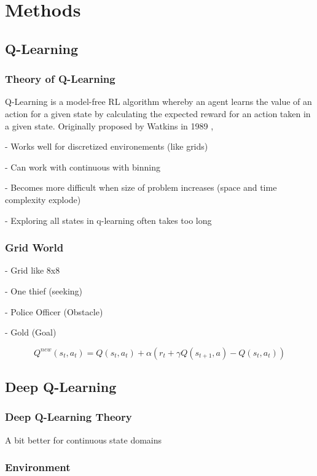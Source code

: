 \documentclass{jfm}
\begin{document}
\section{Methods}
\subsection{Q-Learning}
\subsubsection{Theory of Q-Learning}
Q-Learning is a model-free RL algorithm whereby an agent learns the value of an action for a given state  by calculating the expected reward for an action taken in a given state. Originally proposed by Watkins in 1989 \cite{Watkins1989},

- Works well for discretized environements (like grids)

- Can work with continuous with binning

- Becomes more difficult when size of problem increases (space and time complexity explode)

- Exploring all states in q-learning often takes too long

\subsubsection{Grid World}
- Grid like 8x8

- One thief (seeking)

- Police Officer (Obstacle)

- Gold (Goal)



\begin{equation}
Q^{new}(s_t,a_t) = Q(s_t,a_t) + \alpha \left(r_t +  \gamma Q(s_{t+1},a) - Q(s_t,a_t)\right)
\end{equation}


\subsection{Deep Q-Learning}
\subsubsection{Deep Q-Learning Theory}
A bit better for continuous state domains



\subsubsection{Environment}
\cite{Florian2007}
\end{document}
